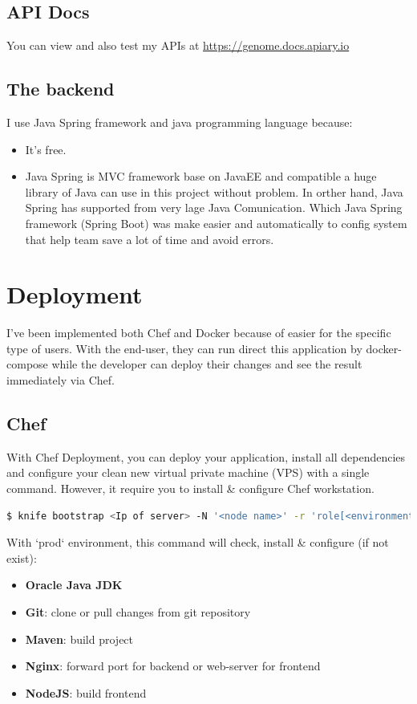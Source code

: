 \documentclass[a4paper,12pt]{article}
\begin{document}
\subsection{API Docs}
You can view and also test my APIs at \url{https://genome.docs.apiary.io}

\subsection{The backend}
I use Java Spring framework and java programming language because:
\begin{itemize}
	\item It's free.
	\item Java Spring is MVC framework base on JavaEE and compatible a huge library of Java can use in this project without problem. In orther hand, Java Spring has supported from very lage Java Comunication. Which Java Spring framework (Spring Boot) was make easier and automatically to config system that help team save a lot of time and avoid errors.
\end{itemize}

\section{Deployment}
I've been implemented both Chef and Docker because of easier for the specific type of users.  With the end-user, they can run direct this application by docker-compose while the developer can deploy their changes and see the result immediately via Chef.
\subsection{Chef}
With Chef Deployment, you can deploy your application, install all dependencies and  configure your clean new virtual private machine (VPS) with a single command. However, it require you to install \& configure Chef workstation. 
\\
\begin{lstlisting}[language=bash]
  $ knife bootstrap <Ip of server> -N '<node name>' -r 'role[<environment>]' --ssh-user <user name on node> --sudo --ssh-identity-file <ssh private credential> --secret-file <location of secret file>
\end{lstlisting}

With `prod` environment, this command will check, install \& configure (if not exist):
\begin{itemize}
	\item \textbf{Oracle Java JDK}
	\item \textbf{Git}: clone or pull changes from git repository
	\item \textbf{Maven}: build project
	\item \textbf{Nginx}: forward port for backend or web-server for frontend
	\item \textbf{NodeJS}: build frontend
\end{itemize}
\end{document}
